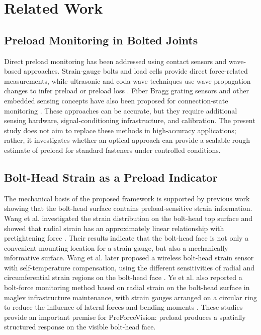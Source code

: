 \section{Related Work}

\subsection{Preload Monitoring in Bolted Joints}

Direct preload monitoring has been addressed using contact sensors and wave-based approaches. Strain-gauge bolts and load cells provide direct force-related measurements, while ultrasonic and coda-wave techniques use wave propagation changes to infer preload or preload loss \cite{chen2022coda,chen2023fullrange}. Fiber Bragg grating sensors and other embedded sensing concepts have also been proposed for connection-state monitoring \cite{deng2022fbg}. These approaches can be accurate, but they require additional sensing hardware, signal-conditioning infrastructure, and calibration. The present study does not aim to replace these methods in high-accuracy applications; rather, it investigates whether an optical approach can provide a scalable rough estimate of preload for standard fasteners under controlled conditions.

\subsection{Bolt-Head Strain as a Preload Indicator}

The mechanical basis of the proposed framework is supported by previous work showing that the bolt-head surface contains preload-sensitive strain information. Wang et al. investigated the strain distribution on the bolt-head top surface and showed that radial strain has an approximately linear relationship with pretightening force \cite{wang2020bolt}. Their results indicate that the bolt-head face is not only a convenient mounting location for a strain gauge, but also a mechanically informative surface. Wang et al. later proposed a wireless bolt-head strain sensor with self-temperature compensation, using the different sensitivities of radial and circumferential strain regions on the bolt-head face \cite{wang2024head}. Ye et al. also reported a bolt-force monitoring method based on radial strain on the bolt-head surface in maglev infrastructure maintenance, with strain gauges arranged on a circular ring to reduce the influence of lateral forces and bending moments \cite{ye2024maglev}. These studies provide an important premise for PreForceVision: preload produces a spatially structured response on the visible bolt-head face.

